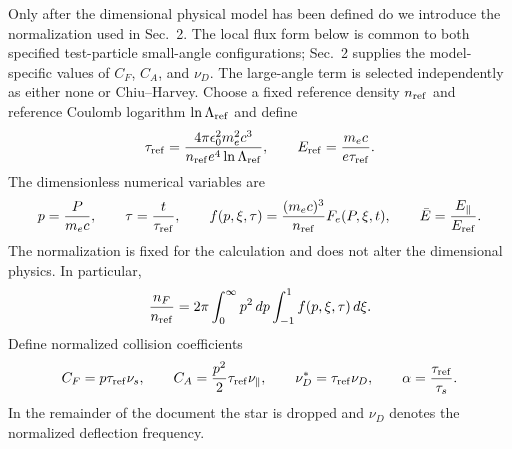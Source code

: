 \documentclass[11pt]{article}
\begin{document}
Only after the dimensional physical model has been defined do we introduce the
normalization used in Sec.~2.  The local flux form below is common to both specified
test-particle small-angle configurations; Sec.~2 supplies the model-specific values of
$C_F$, $C_A$, and $\nu_D$.  The large-angle term is selected independently as either none or Chiu--Harvey.  Choose a fixed reference density $n_{\rm ref}$
and reference Coulomb logarithm $\ln\Lambda_{\rm ref}$ and define
\begin{equation}
 \tau_{\rm ref}
 =\frac{4\pi\epsilon_0^2m_e^2c^3}
 {n_{\rm ref}e^4\ln\Lambda_{\rm ref}},
 \qquad
 E_{\rm ref}=\frac{m_ec}{e\tau_{\rm ref}}.
 \label{eq:reference_scales}
\end{equation}
The dimensionless numerical variables are
\begin{equation}
 p=\frac{P}{m_ec},
 \qquad
 \tau=\frac{t}{\tau_{\rm ref}},
 \qquad
 f(p,\xi,\tau)=\frac{(m_ec)^3}{n_{\rm ref}}F_e(P,\xi,t),
 \qquad
 \bar E=\frac{E_\parallel}{E_{\rm ref}}.
 \label{eq:numerical_normalization}
\end{equation}
The normalization is fixed for the calculation and does not alter the dimensional
physics.  In particular,
\begin{equation}
 \frac{n_F}{n_{\rm ref}}
 =2\pi\int_0^\infty p^2\,dp\int_{-1}^{1}f(p,\xi,\tau)\,d\xi.
 \label{eq:normalized_density}
\end{equation}
Define normalized collision coefficients
\begin{equation}
 C_F=p\tau_{\rm ref}\nu_s,
 \qquad
 C_A=\frac{p^2}{2}\tau_{\rm ref}\nu_\parallel,
 \qquad
 \nu_D^{\ast}=\tau_{\rm ref}\nu_D,
 \qquad
 \alpha=\frac{\tau_{\rm ref}}{\tau_s}.
 \label{eq:normalized_coefficients}
\end{equation}
In the remainder of the document the star is dropped and $\nu_D$ denotes the
normalized deflection frequency.
\end{document}
